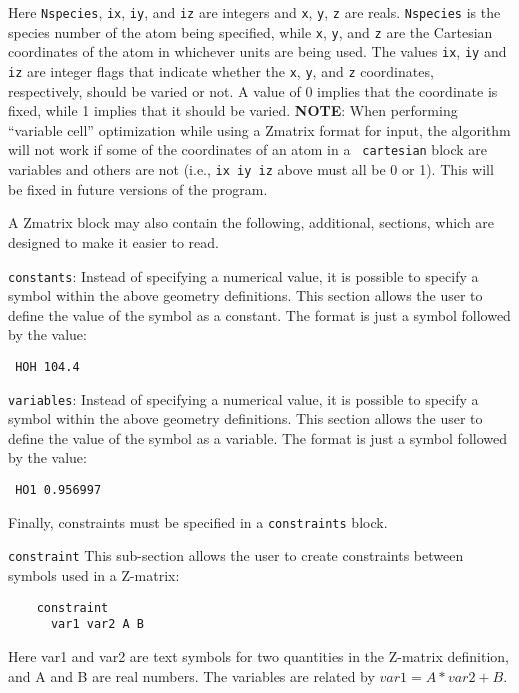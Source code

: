 \documentclass[11pt]{article}
\begin{document}
\begin{description}
Here \texttt{Nspecies}, \texttt{ix}, \texttt{iy}, and \texttt{iz} are
integers and \texttt{x}, \texttt{y}, \texttt{z} are
reals. \texttt{Nspecies} is the species number of the atom being
specified, while \texttt{x}, \texttt{y}, and \texttt{z} are the
Cartesian coordinates of the atom in whichever units are being
used. The values \texttt{ix}, \texttt{iy} and \texttt{iz} are integer
flags that indicate whether the \texttt{x}, \texttt{y}, and \texttt{z}
coordinates, respectively, should be varied or not. A value of 0
implies that the coordinate is fixed, while 1 implies that it should
be varied.  {\bf NOTE}: When performing ``variable cell''
optimization while using a Zmatrix format for input, the algorithm
will not work if some of the coordinates of an atom in a {\tt
cartesian} block are variables and others are not (i.e.,
\texttt{ix iy iz} above must all be 0 or 1). This will be fixed in
future versions of the program.

A Zmatrix block may also contain the following, additional, sections, which
are designed to make it easier to read.

\item \texttt{constants}: Instead of specifying a numerical value, it
  is possible to specify a symbol within the above geometry
  definitions. This section allows the user to define the value of the
  symbol as a constant. The format is just a symbol followed by the
  value:

\noindent\texttt{      HOH 104.4}

\item \texttt{variables}: Instead of specifying a numerical value, it
  is possible to specify a symbol within the above geometry
  definitions. This section allows the user to define the value of the
  symbol as a variable. The format is just a symbol followed by the
  value:

\noindent\texttt{      HO1 0.956997}

Finally, constraints must be specified in a \texttt{constraints} block.

\item \texttt{constraint} This sub-section allows the user to create
  constraints between symbols used in a Z-matrix:
\begin{verbatim}
    constraint
      var1 var2 A B
\end{verbatim}
Here var1 and var2 are text symbols for two quantities in the Z-matrix
definition, and A and B are real numbers. The variables are related by
$var1 = A*var2 + B$.


\end{description}
\end{document}
